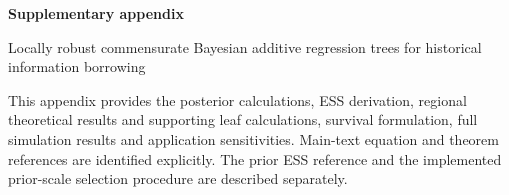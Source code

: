 \documentclass[11pt]{article}
\begin{document}
\begin{center}
{\Large\bfseries Supplementary appendix}\par\medskip
{Locally robust commensurate Bayesian additive regression trees for historical information borrowing}\par
{}
\end{center}
\noindent This appendix provides the posterior calculations, ESS derivation, regional theoretical results and supporting leaf calculations, survival formulation, full simulation results and application sensitivities. Main-text equation and theorem references are identified explicitly. The prior ESS reference and the implemented prior-scale selection procedure are described separately.
\tableofcontents
\clearpage
\appendix
{}








\end{document}
